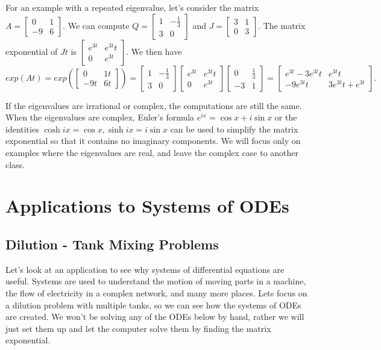 For an example with a repeated eigenvalue, let's consider the matrix 
$A=
\begin{bmatrix}
 0 & 1 \\
 -9 & 6
\end{bmatrix}
$.  We can compute 
$Q=
\begin{bmatrix}
 1 & -\frac{1}{3} \\
 3 & 0
\end{bmatrix}
$
and
$J=
\begin{bmatrix}
 3 & 1 \\
 0 & 3
\end{bmatrix}
$. The matrix exponential of $Jt$ is 
$
\begin{bmatrix}
 e^{3 t} & e^{3 t} t \\
 0 & e^{3 t}
\end{bmatrix}
$. We then have
$$exp\left(A t\right) = exp\left(
\begin{bmatrix}
 0 & 1t \\
 -9t & 6t
\end{bmatrix}
\right)
=
\begin{bmatrix}
 1 & -\frac{1}{3} \\
 3 & 0
\end{bmatrix}
\begin{bmatrix}
 e^{3 t} & e^{3 t} t \\
 0 & e^{3 t}
\end{bmatrix}
\begin{bmatrix}
 0 & \frac{1}{3} \\
 -3 & 1
\end{bmatrix}
=
\begin{bmatrix}
 e^{3 t}-3 e^{3 t} t & e^{3 t} t \\
 -9 e^{3 t} t & 3 e^{3 t} t+e^{3 t}
\end{bmatrix}
.
$$

If the eigenvalues are irrational or complex, the computations are still the same. When the eigenvalues are complex, Euler's formula $e^{ix}=\cos x+i\sin x$ or the identities $\cosh ix = \cos x, \sinh ix = i\sin x$ can be used to simplify the matrix exponential so that it contains no imaginary components. We will focus only on examples where the eigenvalues are real, and leave the complex case to another class.


\section{Applications to Systems of ODEs}
\subsection{Dilution - Tank Mixing Problems}
Let's look at an application to see why systems of differential equations are useful. Systems are used to understand the motion of moving parts in a machine, the flow of electricity in a complex network, and many more places. Lets focus on a dilution problem with multiple tanks, so we can see how the systems of ODEs are created. We won't be solving any of the ODEs below by hand, rather we will just set them up and let the computer solve them by finding the matrix exponential.

